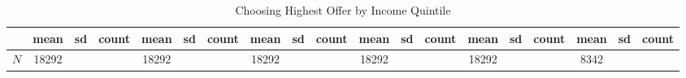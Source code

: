 \begin{table}[htbp]\centering
\def\sym#1{\ifmmode^{#1}\else\(^{#1}\)\fi}
\caption{Choosing Highest Offer by Income Quintile}
\begin{tabular}{l*{6}{ccc}}
\hline\hline
            &        mean&          sd&       count&        mean&          sd&       count&        mean&          sd&       count&        mean&          sd&       count&        mean&          sd&       count&        mean&          sd&       count\\
\hline
\hline
\(N\)       &       18292&            &            &       18292&            &            &       18292&            &            &       18292&            &            &       18292&            &            &        8342&            &            \\
\hline\hline
\end{tabular}
\end{table}
